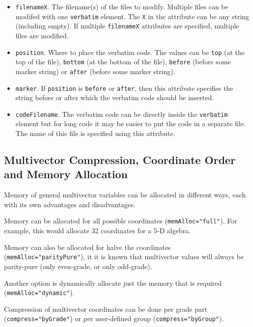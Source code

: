 \documentclass[10pt, a4paper]{article}
\begin{document}
\begin{itemize}
\begin{itemize}
        \item {\tt filenameX}. The filename(s) of the files to modify. Multiple files can be modifed with one {\tt verbatim} element.
         The {\tt X} in the attribute can be any string (including empty). If multiple {\tt filenameX} attributes are specified, multiple
         files are modified.
         
        \item {\tt position}. Where to place the verbatim code. The values can be {\tt top} (at the top of the file), 
            {\tt bottom} (at the bottom of the file), {\tt before} (before some marker string) or
            {\tt after} (before some marker string).
            
        \item {\tt marker}. If {\tt position} is {\tt before} or {\tt after}, then this attribute specifies the string
            before or after which the verbatim code should be inserted.
            
        \item {\tt codeFilename}. The verbatim code can be directly inside the {\tt verbatim} element but for long code
            it may be easier to put the code in a separate file. The name of this file is specified using this attribute.
            
	\end{itemize}
 \end{itemize}
 
 \subsection{Multivector Compression, Coordinate Order and Memory Allocation}
 \label{s:mv_coord}
  
Memory of general multivector variables can be allocated in different ways, each with its own advantages and disadvantages.

Memory can be allocated for all possible coordinates ({\tt memAlloc="full"}). 
For example, this would allocate 32 coordinates for a 5-D algebra.

Memory can also be allocated for halve the coordinates ({\tt memAlloc="parityPure"}), it it is known that multivector values will always be parity-pure 
(only even-grade, or only odd-grade). 

Another option is dynamically allocate just the memory that is required ({\tt memAlloc="dynamic"}).

Compression of multivector coordinates can be done per grade part ({\tt compress="byGrade"}) or per user-defined group ({\tt compress="byGroup"}).
\end{document}
